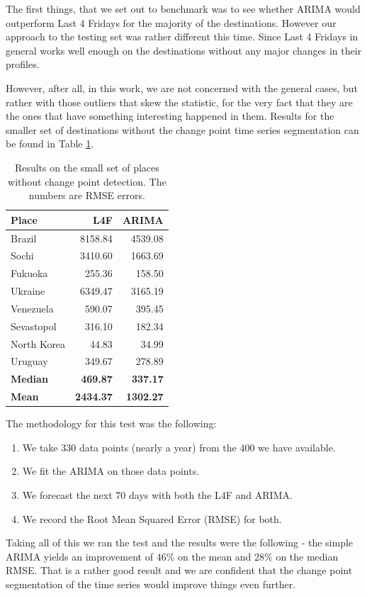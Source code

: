 \documentclass[minf,twoside,singlespacing,parskip,frontabs,notimes,12pt]{infthesis} %
\begin{document}
The first things, that we set out to benchmark was to see whether ARIMA would outperform Last 4 Fridays for the majority of the  destinations. However our approach to the testing set was rather different this time. Since Last 4 Fridays in general works well enough on the destinations without any major changes in their profiles.

However, after all, in this work, we are not concerned with the general cases, but rather with those outliers that skew the statistic, for the very fact that they are the ones that have something interesting happened in them. Results for the smaller set of destinations without the change point time series segmentation can be found in Table \ref{comparison-results-v1}. 

\begin{table}[h!]
\begin{center}
\begin{tabular}{ l | r  | r}
Place & L4F & ARIMA\\
\hline
Brazil & 8158.84 & 4539.08\\
Sochi & 3410.60 & 1663.69\\
Fukuoka & 255.36 & 158.50\\
Ukraine & 6349.47 & 3165.19\\
Venezuela & 590.07 & 395.45\\
Sevastopol & 316.10 & 182.34\\
North Korea & 44.83 & 34.99\\
Uruguay & 349.67 & 278.89\\
\hline
\textbf{Median} & \textbf{469.87} & \textbf{337.17} \\
\hline
\textbf{Mean} & \textbf{2434.37} & \textbf{1302.27}\\
\end{tabular}
\end{center}
\caption{Results on the small set of places without change point detection. The numbers are RMSE errors.}
\label{comparison-results-v1}
\end{table}

The methodology for this test was the following:
\begin{enumerate}
\item We take 330 data points (nearly a year) from the 400 we have available. 
\item We fit the ARIMA on those data points. 
\item We forecast the next 70 days with both the L4F and ARIMA.
\item We record the Root Mean Squared Error (RMSE) for both. 
\end{enumerate}
Taking all of this we ran the test and the results were the following - the simple ARIMA yields an improvement of 46\% on the mean and 28\% on the median RMSE. That is a rather good result and we are confident that the change point segmentation of the time series would improve things even further. 
\end{document}
